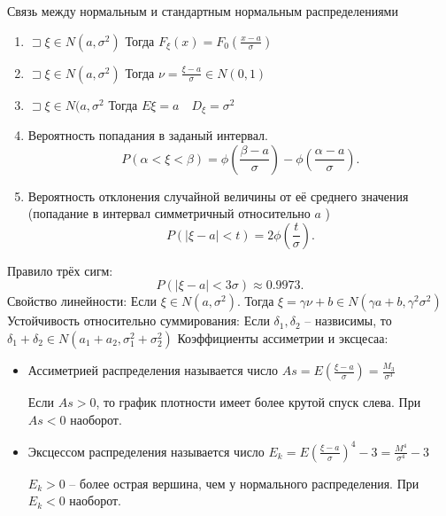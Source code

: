 Связь между нормальным и стандартным нормальным распределениями
\begin{enumerate}
    \item $\sqsupset \xi\in N(a,\sigma^2)$ Тогда $F_\xi(x) = F_0\left( \frac{x-a}{\sigma} \right) $
    \item $\sqsupset \xi\in N(a, \sigma^2)$ Тогда $\nu = \frac{\xi - a}{\sigma}\in N(0,1)$
    \item $\sqsupset \xi\in N(a,\sigma^2$ Тогда $E\xi = a\quad D_\xi = \sigma^2$
    \item Вероятность попадания в заданый интервал.
        \[
            P\left( \alpha < \xi < \beta \right) = \phi\left( \frac{\beta -a}{\sigma} \right)  - \phi\left( \frac{\alpha -a}{\sigma} \right)
        .\]
    \item Вероятность отклонения случайной величины от её среднего значения (попадание в интервал симметричный относительно $a$ )
        \[
            P\left( |\xi - a|<t \right)  = 2\phi\left( \frac{t}{\sigma} \right)
        .\]
\end{enumerate}

Правило трёх сигм:
\[
    P\left( |\xi - a| < 3\sigma \right)  \approx 0.9973
.\]
Свойство линейности: Если $\xi\in N\left( a, \sigma^2 \right) $. Тогда $\xi = \gamma\nu + b\in N\left( \gamma a + b, \gamma^2\sigma^2 \right) $
Устойчивость относительно суммирования: Если $\delta_1, \delta_2$ -- назвисимы, то $\delta_1 + \delta_2\in N\left( a_1+a_2, \sigma_1^2 + \sigma_2^2 \right) $
Коэффициенты ассиметрии и эксцесаа:
\begin{itemize}
    \item Ассиметрией распределения называется число $As = E\left( \frac{\xi - a}{\sigma} \right) = \frac{M_3}{\sigma^3}$

        Если $As > 0$, то график плотности имеет более крутой спуск слева. При  $As < 0$ наоборот.
    \item Эксцессом распределения называется число  $E_k = E\left( \frac{\xi - a}{\sigma} \right) ^{4} - 3 = \frac{M^4}{\sigma^4} - 3$

        $E_k >0$ -- более острая вершина, чем у нормального распределения. При  $E_k < 0$ наоборот.
\end{itemize}
